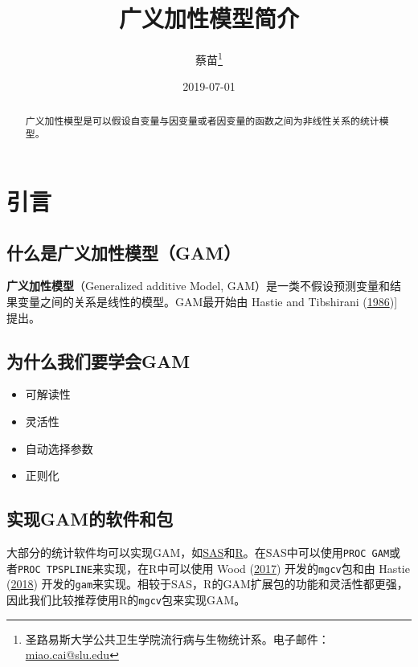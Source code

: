 \documentclass[]{ctexart}
\title{广义加性模型简介}
\author{蔡苗\footnote{圣路易斯大学公共卫生学院流行病与生物统计系。电子邮件：
  \url{miao.cai@slu.edu}}}
\date{2019-07-01}
\providecommand{\tightlist}{%
  \setlength{\itemsep}{0pt}\setlength{\parskip}{0pt}}
\begin{document}
\maketitle
\begin{abstract}
广义加性模型是可以假设自变量与因变量或者因变量的函数之间为非线性关系的统计模型。
\end{abstract}

{
\setcounter{tocdepth}{2}
\tableofcontents
}
\clearpage
\doublespacing

\hypertarget{section}{%
\section{引言}\label{section}}

\hypertarget{gam}{%
\subsection{什么是广义加性模型（GAM）}\label{gam}}

\textbf{广义加性模型}（Generalized additive Model,
GAM）是一类不假设预测变量和结果变量之间的关系是线性的模型。GAM最开始由
Hastie and Tibshirani
(\protect\hyperlink{ref-hastie1986generalized}{1986}){]} 提出。

\hypertarget{gam-1}{%
\subsection{为什么我们要学会GAM}\label{gam-1}}

\begin{itemize}
\tightlist
\item
  可解读性
\item
  灵活性
\item
  自动选择参数
\item
  正则化
\end{itemize}

\hypertarget{gam-2}{%
\subsection{实现GAM的软件和包}\label{gam-2}}

大部分的统计软件均可以实现GAM，如\href{https://www.sas.com/en_us/home.html}{SAS}和\href{https://www.r-project.org/}{R}。在SAS中可以使用\texttt{PROC\ GAM}或者\texttt{PROC\ TPSPLINE}来实现，在R中可以使用
Wood (\protect\hyperlink{ref-wood2017generalized}{2017})
开发的\texttt{mgcv}包和由 Hastie (\protect\hyperlink{ref-Rgam}{2018})
开发的\texttt{gam}来实现。相较于SAS，R的GAM扩展包的功能和灵活性都更强，因此我们比较推荐使用R的\texttt{mgcv}包来实现GAM。
\end{document}
